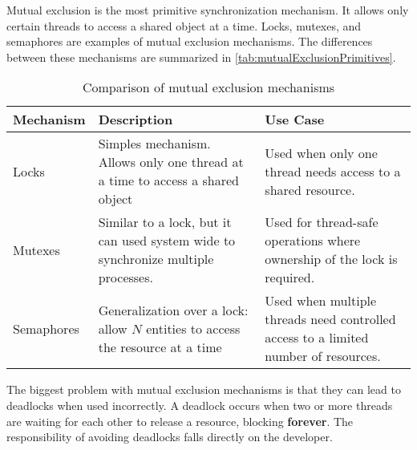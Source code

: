 Mutual exclusion is the most primitive synchronization mechanism.
It allows only certain threads to access a shared object at a time.
Locks, mutexes, and semaphores are examples of mutual exclusion mechanisms.
The differences between these mechanisms are summarized in \autoref{tab:mutualExclusionPrimitives}.

\begin{table}[!htp]
    \caption{Comparison of mutual exclusion mechanisms}
    \label{tab:mutualExclusionPrimitives}
    \centering
    \begin{tabularx}{\textwidth}{|l|X|X|}
        \hline
        \textbf{Mechanism} & \textbf{Description} & \textbf{Use Case} \\
        \hline
        Locks & 
        Simples mechanism. Allows only one thread at a time to access a shared object& 
        Used when only one thread needs access to a shared resource. \\
        \hline
        Mutexes & 
        Similar to a lock, but it can used system wide to synchronize multiple processes. & 
        Used for thread-safe operations where ownership of the lock is required. \\
        \hline
        Semaphores & 
        Generalization over a lock: allow $N$ entities to access the resource at a time & 
        Used when multiple threads need controlled access to a limited number of resources. \\
        \hline
    \end{tabularx}
\end{table}

The biggest problem with mutual exclusion mechanisms is that they can
lead to deadlocks when used incorrectly.
A deadlock occurs when two or more threads are waiting
for each other to release a resource, blocking \textbf{forever}.
The responsibility of avoiding deadlocks falls directly on the developer.